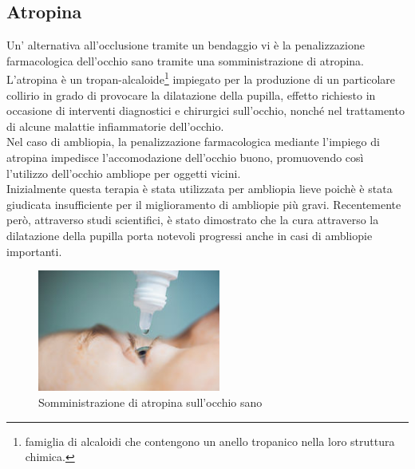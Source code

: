 \documentclass[12pt,a4paper,openright,twoside]{book}
\begin{document}
    \subsection{Atropina}
    Un' alternativa all'occlusione tramite un bendaggio vi è la penalizzazione farmacologica dell'occhio sano tramite una somministrazione di atropina.\\
    L'atropina è un tropan-alcaloide\footnote{famiglia di alcaloidi che contengono un anello tropanico nella loro struttura chimica.} impiegato per la produzione di un particolare collirio in grado di provocare la dilatazione della pupilla, effetto richiesto in occasione di interventi diagnostici e chirurgici sull'occhio, nonché nel trattamento di alcune malattie infiammatorie dell'occhio.\\
    Nel caso di ambliopia, la penalizzazione farmacologica mediante l'impiego di atropina impedisce l’accomodazione dell’occhio buono, promuovendo così l'utilizzo dell'occhio ambliope per oggetti vicini.\\
    Inizialmente questa terapia è stata utilizzata per ambliopia lieve poichè è stata giudicata insufficiente per il miglioramento di ambliopie più gravi. Recentemente però, attraverso studi scientifici, è stato dimostrato che la cura attraverso la dilatazione della pupilla porta notevoli progressi anche in casi di ambliopie importanti.
    \begin{figure}[h]
    	\centering   	
    	\includegraphics[width=60mm]{atrop.jpg}
    	\caption{Somministrazione di atropina sull'occhio sano}
    	\label{fig:atrop}
    \end{figure}
\newpage
\end{document}
